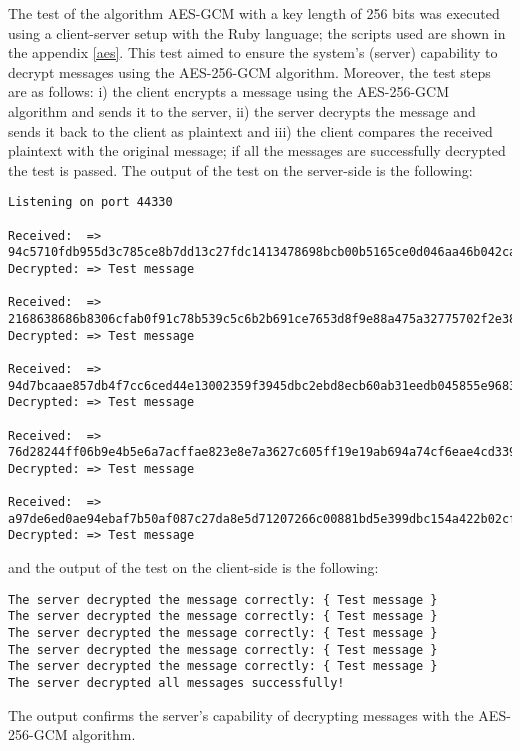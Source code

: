 The test of the algorithm AES-GCM with a key length of 256 bits was executed using a client-server setup with the Ruby language; the scripts used are shown in the appendix \ref{aes}. This test aimed to ensure the system's (server) capability to decrypt messages using the AES-256-GCM algorithm. Moreover, the test steps are as follows: i) the client encrypts a message using the AES-256-GCM algorithm and sends it to the server, ii) the server decrypts the message and sends it back to the client as plaintext and iii) the client compares the received plaintext with the original message; if all the messages are successfully decrypted the test is passed. The output of the test on the server-side is the following:
\begin{scriptsize}
\begin{verbatim}
Listening on port 44330

Received:  => 94c5710fdb955d3c785ce8b7dd13c27fdc1413478698bcb00b5165ce0d046aa46b042ca5d411d557
Decrypted: => Test message

Received:  => 2168638686b8306cfab0f91c78b539c5c6b2b691ce7653d8f9e88a475a32775702f2e383876c98b9
Decrypted: => Test message

Received:  => 94d7bcaae857db4f7cc6ced44e13002359f3945dbc2ebd8ecb60ab31eedb045855e96837355d4732
Decrypted: => Test message

Received:  => 76d28244ff06b9e4b5e6a7acffae823e8e7a3627c605ff19e19ab694a74cf6eae4cd339e5243ecef
Decrypted: => Test message

Received:  => a97de6ed0ae94ebaf7b50af087c27da8e5d71207266c00881bd5e399dbc154a422b02cf68728499e
Decrypted: => Test message
\end{verbatim}
\end{scriptsize}

and the output of the test on the client-side is the following:
\begin{verbatim}
The server decrypted the message correctly: { Test message }
The server decrypted the message correctly: { Test message }
The server decrypted the message correctly: { Test message }
The server decrypted the message correctly: { Test message }
The server decrypted the message correctly: { Test message }
The server decrypted all messages successfully!
\end{verbatim}

The output confirms the server's capability of decrypting messages with the AES-256-GCM algorithm.




